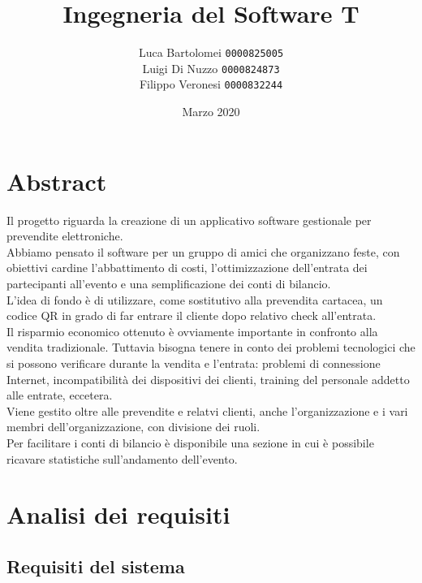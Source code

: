\documentclass[a4paper]{article}
\title{Ingegneria del Software T}
\author{
    Luca Bartolomei 
    \texttt{0000825005}
    \\
    Luigi Di Nuzzo
    \texttt{0000824873}
    \\
    Filippo Veronesi
    \texttt{0000832244}
}
\date{Marzo 2020}
\begin{document}
\maketitle

\tableofcontents

\newpage

\section{Abstract}

Il progetto riguarda la creazione di un applicativo software gestionale per prevendite elettroniche.\\
Abbiamo pensato il software per un gruppo di amici che organizzano feste, con obiettivi cardine l'abbattimento di costi, l'ottimizzazione dell'entrata dei partecipanti all'evento e una semplificazione dei conti di bilancio.\\
L'idea di fondo è di utilizzare, come sostitutivo alla prevendita cartacea, un codice QR in grado di far entrare il cliente dopo relativo check all'entrata.\\
Il risparmio economico ottenuto è ovviamente importante in confronto alla vendita tradizionale. Tuttavia bisogna tenere in conto dei problemi tecnologici che si possono verificare durante la vendita e l'entrata: problemi di connessione Internet, incompatibilità dei dispositivi dei clienti, training del personale addetto alle entrate, eccetera.\\
Viene gestito oltre alle prevendite e relatvi clienti, anche l'organizzazione e i vari membri dell'organizzazione, con divisione dei ruoli.\\
Per facilitare i conti di bilancio è disponibile una sezione in cui è possibile ricavare statistiche sull'andamento dell'evento.

\newpage

\section{Analisi dei requisiti}

\subsection{Requisiti del sistema}
\end{document}
